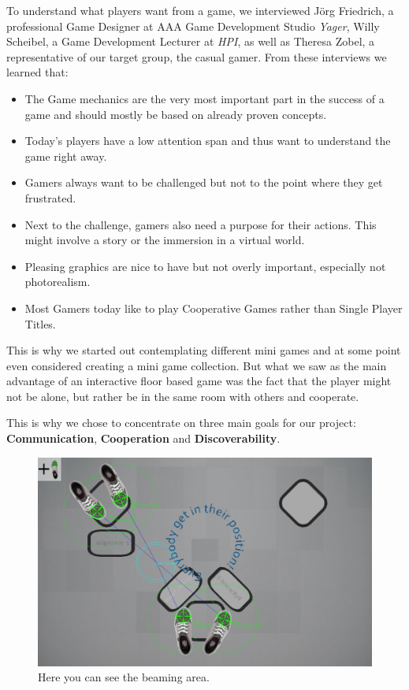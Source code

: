 \documentclass{sigchi}
\begin{document}
To understand what players want from a game, we interviewed J\"org Friedrich, a professional Game Designer at AAA Game Development Studio \textit{Yager}, Willy Scheibel, a Game Development Lecturer at \textit{HPI}, as well as Theresa Zobel, a representative of our target group, the casual gamer. From these interviews we learned that:
\begin{itemize}
\item The Game mechanics are the very most important part in the success of a game and should mostly be based on already proven concepts.
\item Today's players have a low attention span and thus want to understand the game right away.
\item Gamers always want to be challenged but not to the point where they get frustrated.
\item Next to the challenge, gamers also need a purpose for their actions. This might involve a story or the immersion in a virtual world.
\item Pleasing graphics are nice to have but not overly important, especially not photorealism.
\item Most Gamers today like to play Cooperative Games rather than Single Player Titles.
\end{itemize}


This is why we started out contemplating different mini games and at some point even considered creating a mini game collection. But what we saw as the main advantage of an interactive floor based game was the fact that the player might not be alone, but rather be in the same room with others and cooperate. 

This is why we chose to concentrate on three main goals for our project: \textbf{Communication}, \textbf{Cooperation} and \textbf{Discoverability}.



\begin{figure}[!h]
\centering
\includegraphics[width=0.9\columnwidth]{Figure1}
\caption{Here you can see the beaming area.}
\label{fig:figure1}
\end{figure}
\end{document}

